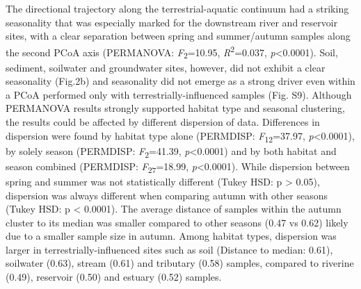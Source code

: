 \documentclass[12pt,a4paper]{article} %
\begin{document}
The directional trajectory along the terrestrial-aquatic continuum had a striking seasonality that was especially marked for the downstream river and reservoir sites, with a clear separation between spring and summer/autumn samples along the second PCoA axis (PERMANOVA: \textit{F}\textsubscript{2}=10.95, \textit{R}\textsuperscript{2}=0.037, \textit{p}<0.0001). Soil, sediment, soilwater and groundwater sites, however, did not exhibit a clear seasonality (Fig.2b) and seasonality did not emerge as a strong driver even within a PCoA performed only with terrestrially-influenced samples (Fig. S9). Although PERMANOVA results strongly supported habitat type and seasonal clustering, the results could be affected by different dispersion of data. Differences in dispersion were found by habitat type alone (PERMDISP: \textit{F}\textsubscript{12}=37.97, \textit{p}<0.0001), by solely season (PERMDISP: \textit{F}\textsubscript{2}=41.39, \textit{p}<0.0001) and by both habitat and season combined (PERMDISP: \textit{F}\textsubscript{27}=18.99, \textit{p}<0.0001). While dispersion between spring and summer was not statistically different (Tukey HSD: p > 0.05), dispersion was always different when comparing autumn with other seasons (Tukey HSD: p < 0.0001). The average distance of samples within the autumn cluster to its median was smaller compared to other seasons (0.47 vs 0.62) likely due to a smaller sample size in autumn. Among habitat types, dispersion was larger in terrestrially-influenced sites such as soil (Distance to median: 0.61), soilwater (0.63), stream (0.61) and tributary (0.58) samples, compared to riverine (0.49), reservoir (0.50) and estuary (0.52) samples.
\end{document}
